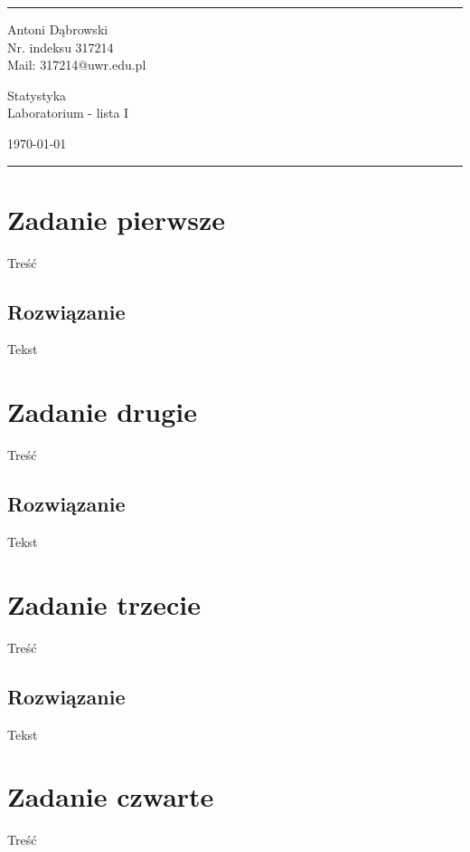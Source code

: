 \documentclass[a4paper]{article}
\begin{document}

\fancyhead[C]{}
\hrule \medskip %
\begin{minipage}{0.295\textwidth} 
\raggedright
\footnotesize
Antoni Dąbrowski \hfill\\   
Nr. indeksu 317214\hfill\\
Mail: 317214@uwr.edu.pl
\end{minipage}
\begin{minipage}{0.4\textwidth} 
\centering 
\large 
Statystyka\\ 
\normalsize 
Laboratorium - lista I\\ 
\end{minipage}
\begin{minipage}{0.295\textwidth} 
\raggedleft
\today\hfill\\
\end{minipage}
\medskip\hrule 
\bigskip



\section{Zadanie pierwsze}
Treść

\subsection{Rozwiązanie}
Tekst

\section{Zadanie drugie}
Treść

\subsection{Rozwiązanie}
Tekst

\section{Zadanie trzecie}
Treść

\subsection{Rozwiązanie}
Tekst

\section{Zadanie czwarte}
Treść
\end{document}
